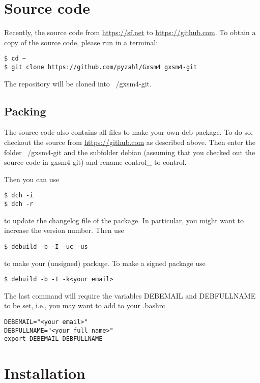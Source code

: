 \section{Source code}

Recently, the source code from \url{https://sf.net} to \url{https://github.com}. To obtain a copy of the source code, please run in a terminal:

\begin{verbatim}
$ cd ~
$ git clone https://github.com/pyzahl/Gxsm4 gxsm4-git
\end{verbatim}

The repository will be cloned into ~/gxsm4-git.

\subsection{Packing}

The source code also contains all files to make your own deb-package. To do so, checkout the source from \url{https://github.com} as described above. Then enter the folder ~/gxsm4-git and the subfolder debian (assuming that you checked out the source code in gxsm4-git) and rename control\_<your ubuntu> to control.

Then you can use 

\begin{verbatim}
$ dch -i
$ dch -r
\end{verbatim}

to update the changelog file of the package. In particular, you might want to increase the version number. Then use

\begin{verbatim}
$ debuild -b -I -uc -us
\end{verbatim}

to make your (unsigned) package. To make a signed package use

\begin{verbatim}
$ debuild -b -I -k<your email>
\end{verbatim}

The last command will require the variables DEBEMAIL and DEBFULLNAME to be set, i.e., you may want to add to your .bashrc\\

\begin{verbatim}
DEBEMAIL="<your email>"
DEBFULLNAME="<your full name>"
export DEBEMAIL DEBFULLNAME
\end{verbatim}

\section{Installation}

